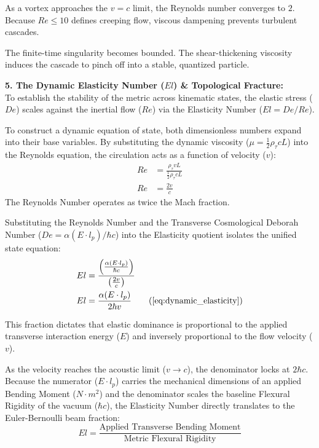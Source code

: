 As a vortex approaches the $v=c$ limit, the Reynolds number converges to $2$. Because $Re \le 10$ defines creeping flow, viscous dampening prevents turbulent cascades. 

The finite-time singularity becomes bounded. The shear-thickening viscosity induces the cascade to pinch off into a stable, quantized particle. 

\vspace{0.2 cm}

\textbf{5. The Dynamic Elasticity Number ($El$) \& Topological Fracture:} \\
To establish the stability of the metric across kinematic states, the elastic stress ($De$) scales against the inertial flow ($Re$) via the Elasticity Number ($El = De/Re$). 

To construct a dynamic equation of state, both dimensionless numbers expand into their base variables. By substituting the dynamic viscosity ($\mu = \frac{1}{2} \rho_\tau c L$) into the Reynolds equation, the circulation acts as a function of velocity ($v$): 
\begin{align}
    Re &= \frac{\rho_\tau v L}{\frac{1}{2} \rho_\tau c L} \\ 
    Re &= \frac{2v}{c}
\end{align}
The Reynolds Number operates as twice the Mach fraction. 

Substituting the Reynolds Number and the Transverse Cosmological Deborah Number ($De = \alpha (E \cdot l_p) / \hbar c$) into the Elasticity quotient isolates the unified state equation:
\begin{align}
    El &= \frac{\left( \frac{\alpha (E \cdot l_p)}{\hbar c} \right)}{\left( \frac{2v}{c} \right)} \\ 
    El &= \frac{\alpha (E \cdot l_p)}{2 \hbar v} \tag{\ref{eq:dynamic_elasticity}}
\end{align}

This fraction dictates that elastic dominance is proportional to the applied transverse interaction energy ($E$) and inversely proportional to the flow velocity ($v$). 

As the velocity reaches the acoustic limit ($v \to c$), the denominator locks at $2\hbar c$. Because the numerator ($E \cdot l_p$) carries the mechanical dimensions of an applied Bending Moment ($N \cdot m^2$) and the denominator scales the baseline Flexural Rigidity of the vacuum ($\hbar c$), the Elasticity Number directly translates to the Euler-Bernoulli beam fraction: 
\begin{equation}
    El = \frac{\text{Applied Transverse Bending Moment}}{\text{Metric Flexural Rigidity}} \nonumber
\end{equation}

